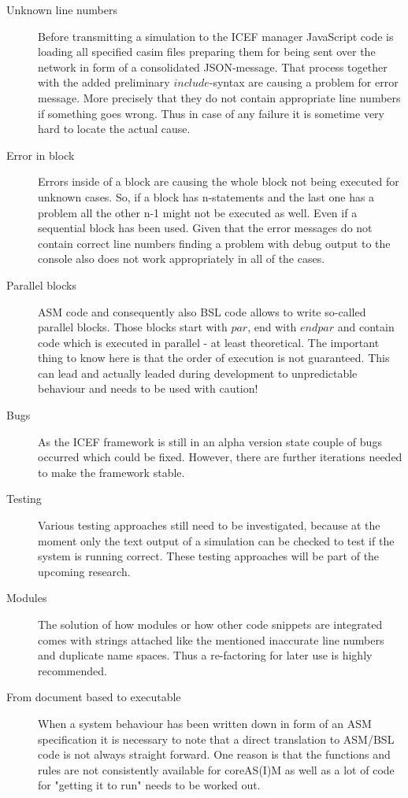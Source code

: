 \begin{description}
	\item[Unknown line numbers] Before transmitting a simulation to the ICEF manager JavaScript code is loading all specified casim files preparing them for being sent over the network in form of a consolidated JSON-message. That process together with the added preliminary $include$-syntax are causing a problem for error message. More precisely that they do not contain appropriate line numbers if something goes wrong. Thus in case of any failure it is sometime very hard to locate the actual cause.
	\item[Error in block] Errors inside of a block are causing the whole block not being executed for unknown cases. So, if a block has n-statements and the last one has a problem all the other n-1 might not be executed as well. Even if a sequential block has been used. Given that the error messages do not contain correct line numbers finding a problem with debug output to the console also does not work appropriately in all of the cases.
	\item[Parallel blocks] ASM code and consequently also BSL code allows to write so-called parallel blocks. Those blocks start with $par$, end with $endpar$ and contain code which is executed in parallel - at least theoretical. The important thing to know here is that the order of execution is not guaranteed. This can lead and actually leaded during development to unpredictable behaviour and needs to be used with caution!
	\item[Bugs] As the ICEF framework is still in an alpha version state couple of bugs occurred which could be fixed. However, there are further iterations needed to make the framework stable.
	\item[Testing] Various testing approaches still need to be investigated, because at the moment only the text output of a simulation can be checked to test if the system is running correct. These testing approaches will be part of the upcoming research.
	\item[Modules] The solution of how modules or how other code snippets are integrated comes with strings attached like the mentioned inaccurate line numbers and duplicate name spaces. Thus a re-factoring for later use is highly recommended.
	\item[From document based to executable] When a system behaviour has been written down in form of an ASM specification it is necessary to note that a direct translation to ASM/BSL code is not always straight forward. One reason is that the functions and rules are not consistently available for coreAS(I)M as well as a lot of code for "getting it to run" needs to be worked out.
\end{description}

